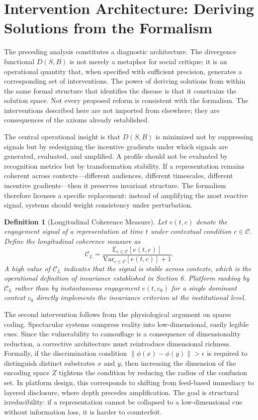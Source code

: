 \documentclass[11pt]{article}
\newtheorem{definition}{Definition}
\begin{document}
\section{Intervention Architecture: Deriving Solutions from the Formalism}

The preceding analysis constitutes a diagnostic architecture. The divergence functional $D(S,B)$ is not merely a metaphor for social critique; it is an operational quantity that, when specified with sufficient precision, generates a corresponding set of interventions. The power of deriving solutions from within the same formal structure that identifies the disease is that it constrains the solution space. Not every proposed reform is consistent with the formalism. The interventions described here are not imported from elsewhere; they are consequences of the axioms already established.

The central operational insight is that $D(S,B)$ is minimized not by suppressing signals but by redesigning the incentive gradients under which signals are generated, evaluated, and amplified. A profile should not be evaluated by recognition metrics but by transformation stability. If a representation remains coherent across contexts---different audiences, different timescales, different incentive gradients---then it preserves invariant structure. The formalism therefore licenses a specific replacement: instead of amplifying the most reactive signal, systems should weight consistency under perturbation.

\begin{definition}[Longitudinal Coherence Measure]
Let $e(t, c)$ denote the engagement signal of a representation at time $t$ under contextual condition $c \in \mathcal{C}$. Define the longitudinal coherence measure as
\[
\mathcal{C}_L = \frac{\mathbb{E}_{c \in \mathcal{C}}[e(t,c)]}{\mathrm{Var}_{c \in \mathcal{C}}[e(t,c)] + 1}.
\]
A high value of $\mathcal{C}_L$ indicates that the signal is stable across contexts, which is the operational definition of invariance established in Section 6. Platform ranking by $\mathcal{C}_L$ rather than by instantaneous engagement $e(t, c_0)$ for a single dominant context $c_0$ directly implements the invariance criterion at the institutional level.
\end{definition}

The second intervention follows from the physiological argument on sparse coding. Spectacular systems compress reality into low-dimensional, easily legible cues. Since the vulnerability to camouflage is a consequence of dimensionality reduction, a corrective architecture must reintroduce dimensional richness. Formally, if the discrimination condition $\|\phi(x) - \phi(y)\| > \epsilon$ is required to distinguish distinct substrates $x$ and $y$, then increasing the dimension of the encoding space $Z$ tightens the condition by reducing the radius of the confusion set. In platform design, this corresponds to shifting from feed-based immediacy to layered disclosure, where depth precedes amplification. The goal is structural irreducibility: if a representation cannot be collapsed to a low-dimensional cue without information loss, it is harder to counterfeit.
\end{document}
